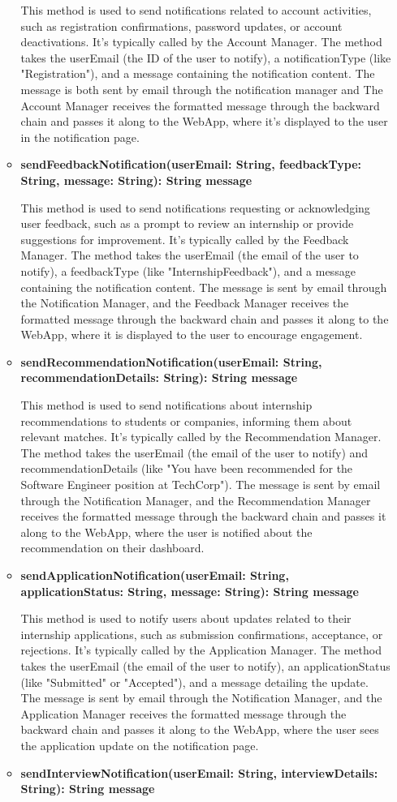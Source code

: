 \begin{itemize}
\begin{itemize}
    This method is used to send notifications related to account activities, such as registration confirmations, password updates, or account deactivations. It’s typically called by the Account Manager.
    The method takes the userEmail (the ID of the user to notify), a notificationType (like "Registration"), and a message containing the notification content. The message is both sent by email through the notification manager and The Account Manager receives the formatted message through the backward chain and passes it along to the WebApp, where it’s displayed to the user in the notification page.
    \item \textbf{sendFeedbackNotification(userEmail: String, feedbackType: String, message: String): String message
}

    This method is used to send notifications requesting or acknowledging user feedback, such as a prompt to review an internship or provide suggestions for improvement. It’s typically called by the Feedback Manager.
    The method takes the userEmail (the email of the user to notify), a feedbackType (like "InternshipFeedback"), and a message containing the notification content. The message is sent by email through the Notification Manager, and the Feedback Manager receives the formatted message through the backward chain and passes it along to the WebApp, where it is displayed to the user to encourage engagement.
    \item \textbf{sendRecommendationNotification(userEmail: String, recommendationDetails: String): String message
}

    This method is used to send notifications about internship recommendations to students or companies, informing them about relevant matches. It’s typically called by the Recommendation Manager.
    The method takes the userEmail (the email of the user to notify) and recommendationDetails (like "You have been recommended for the Software Engineer position at TechCorp"). The message is sent by email through the Notification Manager, and the Recommendation Manager receives the formatted message through the backward chain and passes it along to the WebApp, where the user is notified about the recommendation on their dashboard.
    \item \textbf{sendApplicationNotification(userEmail: String, applicationStatus: String, message: String): String message}

    This method is used to notify users about updates related to their internship applications, such as submission confirmations, acceptance, or rejections. It’s typically called by the Application Manager.
    The method takes the userEmail (the email of the user to notify), an applicationStatus (like "Submitted" or "Accepted"), and a message detailing the update. The message is sent by email through the Notification Manager, and the Application Manager receives the formatted message through the backward chain and passes it along to the WebApp, where the user sees the application update on the notification page.
    \item \textbf{sendInterviewNotification(userEmail: String, interviewDetails: String): String message}


\end{itemize}
\end{itemize}
